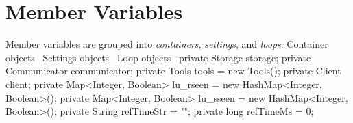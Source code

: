 \section{Member Variables}
Member variables are grouped into \emph{containers}, \emph{settings}, and
\emph{loops}.
\nwenddocs{}\endmoddef{}
\LA{}Container objects~{\nwtagstyle{}}\RA{}
\LA{}Settings objects~{\nwtagstyle{}}\RA{}
\LA{}Loop objects~{\nwtagstyle{}}\RA{}
\nwendcode{}\nwdocspar
{}
\nwenddocs{}\endmoddef{}
private Storage storage;
private Communicator communicator;
private Tools tools = new Tools();
private Client client;
private Map<Integer, Boolean> lu_rseen = new HashMap<Integer, Boolean>();
private Map<Integer, Boolean> lu_sseen = new HashMap<Integer, Boolean>();
private String refTimeStr = "";
private long refTimeMs = 0;
\nwendcode{}\nwdocspar

